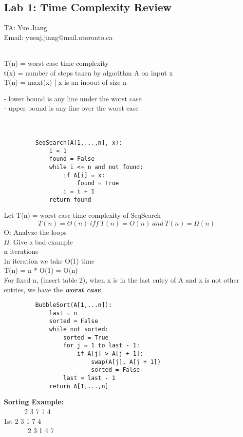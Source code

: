 \documentclass{article}
\begin{document}
	\subsection{Lab 1: Time Complexity Review}	
		
		TA: Yue Jiang\\
		Email: yuenj.jiang@mail.utoronto.ca\\\\
		\begin{center}
			T(n) = worst case time complexity\\
			t(x) = number of steps taken by algorithm A on input x\\
			T(n) = max{t(x) | x is an inoout of size n}\\
		\end{center}
		 - lower bound is any line under the worst case\\
		 - upper bound is any line over the worst case \\\\\\
		 \begin{lstlisting}
		 SeqSearch(A[1,...,n], x):
			 i = 1
			 found = False
			 while i <= n and not found:
				 if A[i] = x:
					 found = True
				 i = i + 1
			 return found
		 \end{lstlisting}
		 Let T(n) = worst case time complexity of SeqSearch\\
		 $$T(n)=\Theta(n)~iff~T(n)=O(n)~and~T(n)=\Omega(n)$$
		 O: Analyze the loops\\
		 $\Omega$: Give a bad example\\
		 n iterations\\
		 In iteration we take O(1) time\\
		 T(n) = n * O(1) = O(n)\\
		 For fixed n, (insert table 2), when x is in the last entry of A and x is not other entries, we have the \textbf{\emph{worst case}}\\
		 \begin{lstlisting}
		 BubbleSort(A[1,...n]):
			 last = n
			 sorted = False
			 while not sorted:
				 sorted = True
				 for j = 1 to last - 1:
					 if A[j] > A[j + 1]:
						 swap(A[j], A[j + 1])
						 sorted = False
				 last = last - 1
			 return A[1,...,n]
		 \end{lstlisting}
		 \textbf{Sorting Example:}\\
		        ~~~~~~2 3 7 1 4\\
		  1st   2 3 1 7 4\\
		        ~~~~~~~2 3 1 4 7\\
\end{document}
